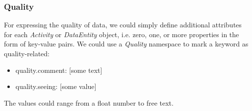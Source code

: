\subsubsection{Quality}
For expressing the quality of data, we could simply define additional 
attributes for each \emph{Activity}
or \emph{DataEntity} object, i.e. zero, one, or more properties in the form of
key-value pairs. We could use a \emph{Quality} namespace to mark a keyword
as quality-related:
\begin{itemize}
    \item quality.comment: [some text]
    \item quality.seeing: [some value]
\end{itemize}
The values could range from a float number to free text.

